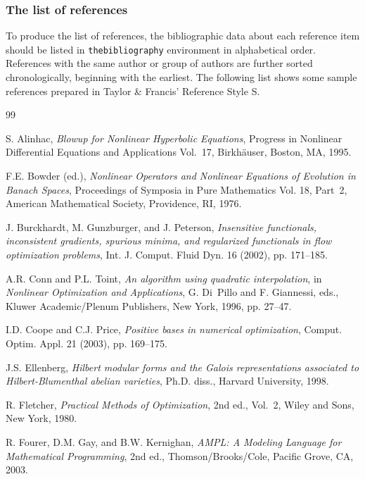 \documentclass[]{interact}
\theoremstyle{plain}%
\theoremstyle{definition}
\theoremstyle{remark}
\begin{document}
\subsubsection{The list of references}

To produce the list of references, the bibliographic data about each reference item should be listed in \texttt{thebibliography} environment in alphabetical order. References with the same author or group of authors are further sorted chronologically, beginning with the earliest. The following list shows some sample references prepared in Taylor \& Francis' Reference Style S.

\begin{thebibliography}{99}

S. Alinhac, \emph{Blowup for Nonlinear Hyperbolic Equations}, Progress in
  Nonlinear Differential Equations and Applications Vol.~17, Birkh{\"a}user,
  Boston, MA, 1995.

F.E. Bowder (ed.), \emph{Nonlinear Operators and Nonlinear Equations of
  Evolution in Banach Spaces}, Proceedings of Symposia in Pure Mathematics
  Vol. 18, Part~2, American Mathematical Society, Providence, RI, 1976.

J. Burckhardt, M. Gunzburger, and J. Peterson, \emph{Insensitive functionals,
  inconsistent gradients, spurious minima, and regularized functionals in flow
  optimization problems}, Int. J. Comput. Fluid Dyn. 16 (2002), pp. 171--185.

A.R. Conn and P.L. Toint, \emph{An algorithm using quadratic interpolation}, in
  \emph{Nonlinear Optimization and Applications}, G. Di~Pillo and F. Giannessi,
  eds., Kluwer Academic/Plenum Publishers, New York, 1996, pp. 27--47.

I.D. Coope and C.J. Price, \emph{Positive bases in numerical optimization},
  Comput. Optim. Appl. 21 (2003), pp. 169--175.

J.S. Ellenberg, \emph{Hilbert modular forms and the Galois representations
  associated to Hilbert-Blumenthal abelian varieties}, Ph.D. diss., Harvard
  University, 1998.

R. Fletcher, \emph{Practical Methods of Optimization}, 2nd ed., Vol.~2, Wiley
  and Sons, New York, 1980.

R. Fourer, D.M. Gay, and B.W. Kernighan, \emph{AMPL: A Modeling Language for
  Mathematical Programming}, 2nd ed., Thomson/Brooks/Cole, Pacific Grove, CA,
  2003.


\end{thebibliography}
\end{document}
